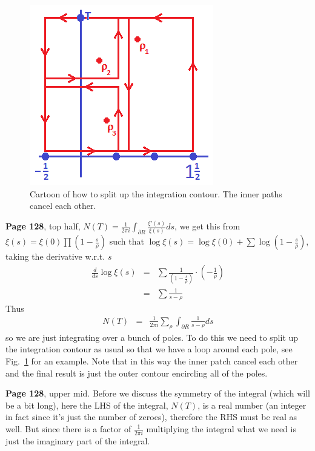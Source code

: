 \documentclass[aps,preprint,preprintnumbers,nofootinbib,showpacs,prd]{revtex4-1}
\newcommand{\nbea}{\begin{eqnarray*}}
\newcommand{\neea}{\end{eqnarray*}}
\begin{document}
%
\begin{figure}
\centering
  \includegraphics[width=.38\linewidth]{NT.png}
  \caption{Cartoon of how to split up the integration contour. The inner paths cancel each other.}
\label{fig:NT}
\end{figure}
%
{\bf Page 128}, top half, $N(T) = \frac{1}{2\pi i}\int_{\partial R} \frac{\xi'(s)}{\xi(s)} ds$, we get this from $\xi(s) = \xi(0) \prod \left (1 - \frac{s}{\rho} \right )$ such that $\log \xi(s) = \log \xi(0) + \sum \log \left (1 - \frac{s}{\rho} \right )$, taking the derivative w.r.t. $s$
%
\nbea
\frac{d}{ds} \log \xi(s) & = & \sum \frac{1}{\left (1 - \frac{s}{\rho} \right )} \cdot \left ( - \frac{1}{\rho} \right ) \\
& = & \sum \frac{1}{s - \rho}
\neea
%
Thus
%
\nbea
N(T) & = & \frac{1}{2\pi i} \sum_\rho \int_{\partial R} \frac {1}{s - \rho} ds
\neea
%
so we are just integrating over a bunch of poles. To do this we need to split up the integration contour as usual so that we have a loop around each pole, see Fig.~\ref{fig:NT} for an example. Note that in this way the inner patch cancel each other and the final result is just the outer contour encircling all of the poles.

{\bf Page 128}, upper mid. Before we discuss the symmetry of the integral (which will be a bit long), here the LHS of the integral, $N(T)$, is a real number (an integer in fact since it's just the number of zeroes), therefore the RHS must be real as well. But since there is a factor of $\frac{1}{2\pi i}$ multiplying the integral what we need is just the imaginary part of the integral.
\end{document}
